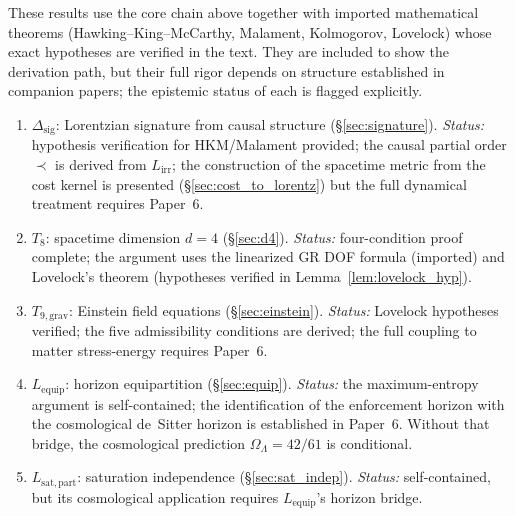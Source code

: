 \documentclass[11pt,a4paper]{article}
\theoremstyle{definition}
\begin{document}
\begin{tcolorbox}[apfbox, title={What Is Assumed, What Is Proved, What Is Deferred}]
These results use the core chain above together with imported mathematical theorems (Hawking--King--McCarthy, Malament, Kolmogorov, Lovelock) whose exact hypotheses are verified in the text.  They are included to show the derivation path, but their full rigor depends on structure established in companion papers; the epistemic status of each is flagged explicitly.
\begin{enumerate}[nosep,label=\arabic*.,leftmargin=2em]
  \item $\Delta_{\mathrm{sig}}$: Lorentzian signature from causal structure (\S\ref{sec:signature}).  \textit{Status:} hypothesis verification for HKM/Malament provided; the causal partial order $\prec$ is derived from $L_{\mathrm{irr}}$; the construction of the spacetime metric from the cost kernel is presented (\S\ref{sec:cost_to_lorentz}) but the full dynamical treatment requires Paper~6.
  \item $T_8$: spacetime dimension $d = 4$ (\S\ref{sec:d4}).  \textit{Status:} four-condition proof complete; the argument uses the linearized GR DOF formula (imported) and Lovelock's theorem (hypotheses verified in Lemma~\ref{lem:lovelock_hyp}).
  \item $T_{9,\mathrm{grav}}$: Einstein field equations (\S\ref{sec:einstein}).  \textit{Status:} Lovelock hypotheses verified; the five admissibility conditions are derived; the full coupling to matter stress-energy requires Paper~6.
  \item $L_{\mathrm{equip}}$: horizon equipartition (\S\ref{sec:equip}).  \textit{Status:} the maximum-entropy argument is self-contained; the identification of the enforcement horizon with the cosmological de~Sitter horizon is established in Paper~6.  Without that bridge, the cosmological prediction $\Omega_\Lambda = 42/61$ is conditional.
  \item $L_{\mathrm{sat,part}}$: saturation independence (\S\ref{sec:sat_indep}).  \textit{Status:} self-contained, but its cosmological application requires $L_{\mathrm{equip}}$'s horizon bridge.
\end{enumerate}


\end{tcolorbox}
\end{document}

